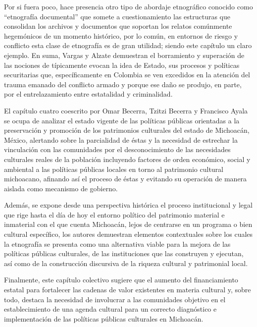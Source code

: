 \documentclass[
  spanish,
  11pt,
  a4paper,
]{scrbook}
\begin{document}
Por si fuera poco, hace presencia otro tipo de abordaje etnográfico
conocido como ``etnografía documental'' que somete a cuestionamiento las
estructuras que consolidan los archivos y documentos que soportan los
relatos comúnmente hegemónicos de un momento histórico, por lo común, en
entornos de riesgo y conflicto esta clase de etnografía es de gran
utilidad; siendo este capítulo un claro ejemplo. En suma, Vargas y
Alzate demuestran el borramiento y superación de las nociones de
típicamente evocan la idea de Estado, sus procesos y políticas
securitarias que, específicamente en Colombia se ven excedidos en la
atención del trauma emanado del conflicto armado y porque ese daño se
produjo, en parte, por el entrelazamiento entre estatalidad y
criminalidad.

\vspace*{.75cm}

El capítulo cuatro coescrito por Omar Becerra, Tzitzi Becerra y
Francisco Ayala se ocupa de analizar el estado vigente de las políticas
públicas orientadas a la preservación y promoción de los patrimonios
culturales del estado de Michoacán, México, alertando sobre la
parcialidad de éstas y la necesidad de estrechar la vinculación con las
comunidades por el desconocimiento de las necesidades culturales reales
de la población incluyendo factores de orden económico, social y
ambiental a las políticas públicas locales en torno al patrimonio
cultural michoacano, afinando así el proceso de éstas y evitando su
operación de manera aislada como mecanismo de gobierno.

Además, se expone desde una perspectiva histórica el proceso
institucional y legal que rige hasta el día de hoy el entorno político
del patrimonio material e inmaterial con el que cuenta Michoacán, lejos
de centrarse en un programa o bien cultural específico, los autores
demuestran elementos contextuales sobre los cuales la etnografía se
presenta como una alternativa viable para la mejora de las políticas
públicas culturales, de las instituciones que las construyen y ejecutan,
así como de la construcción discursiva de la riqueza cultural y
patrimonial local.

Finalmente, este capítulo colectivo sugiere que el aumento del
financiamiento estatal para fortalecer las cadenas de valor existentes
en materia cultural y, sobre todo, destaca la necesidad de involucrar a
las comunidades objetivo en el establecimiento de una agenda cultural
para un correcto diagnóstico e implementación de las políticas públicas
culturales en Michoacán.
\end{document}
